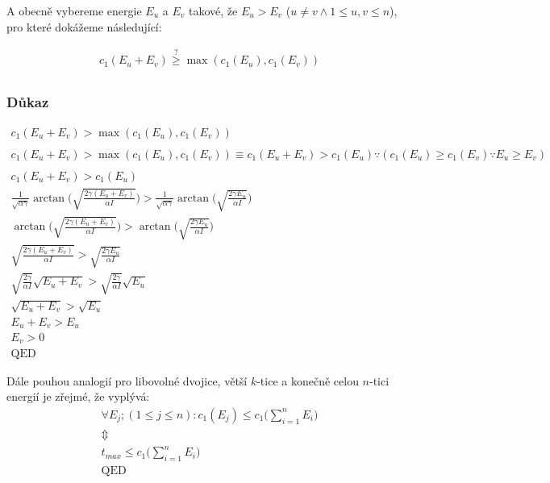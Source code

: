 \documentclass[12pt, a4paper,
 twoside,        %
 openright
]{report}
\begin{document}
A obecně vybereme energie $E_u$ a $E_v$ takové, že $E_u > E_v$ ($u \neq v \wedge 1 \leq u, v \leq n$), pro které dokážeme následující:

\begin{equation}
    \label{eq:max_runtime_proof_p3}
    \begin{gathered}
        c_1(E_u+E_v) \stackrel{?}{\geq} \max(c_1(E_u), c_1(E_v)) \\
    \end{gathered}
\end{equation}

\clearpage

\subsubsection{Důkaz}
\begin{equation}
    \label{eq:max_runtime_proof_p4}
    \begin{gathered}
        c_1(E_u+E_v) > \max(c_1(E_u), c_1(E_v)) \\
        \\
        c_1(E_u+E_v) > \max(c_1(E_u), c_1(E_v)) \equiv c_1(E_u+E_v) > c_1(E_u) \because (c_1(E_u)\geq c_1(E_v) \because E_u \geq E_v) \\
        \\
        c_1(E_u+E_v) > c_1(E_u) \\
        \frac{1}{\sqrt{\alpha\gamma}} \arctan{ \bigg( \sqrt{\frac{2 \gamma (E_u+E_v)}{\alpha I}} \bigg)} > \frac{1}{\sqrt{\alpha\gamma}} \arctan{ \bigg( \sqrt{\frac{2 \gamma E_u}{\alpha I}} \bigg)} \\
        \arctan{ \bigg( \sqrt{\frac{2 \gamma (E_u+E_v)}{\alpha I}} \bigg)} > \arctan{ \bigg( \sqrt{\frac{2 \gamma E_u}{\alpha I}} \bigg)} \\
        \sqrt{\frac{2 \gamma (E_u+E_v)}{\alpha I}} > \sqrt{\frac{2 \gamma E_u}{\alpha I}}\\
        \sqrt{\frac{2 \gamma }{\alpha I}} \sqrt{E_u+E_v} > \sqrt{\frac{2 \gamma}{\alpha I}} \sqrt{E_u}\\
        \sqrt{E_u+E_v} > \sqrt{E_u}\\
        E_u+E_v > E_u\\
        E_v > 0\\
        \text{QED}
    \end{gathered}
\end{equation}

Dále pouhou analogií pro libovolné dvojice, větší $k$-tice a konečně celou $n$-tici energií je zřejmé, že vyplývá:
\begin{equation}
    \label{eq:max_runtime_proof_p5}
    \begin{gathered}
        \forall E_j; (1 \leq j \leq n): c_1(E_j) \leq c_1 \Bigg(\sum_{i=1}^n E_i \Bigg) \\
        \Updownarrow \\
        t_{max} \leq c_1 \Bigg(\sum_{i=1}^n E_i \Bigg) \\
        \text{QED}
    \end{gathered}
\end{equation}
\end{document}
